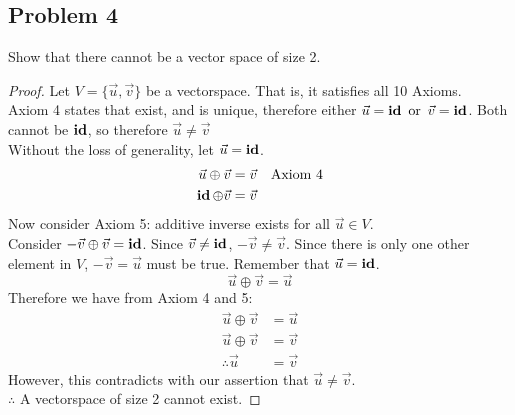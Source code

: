 \subsection*{Problem 4}
Show that there cannot be a vector space of size 2.
\begin{proof}
  Let $V = \{\vec{u}, \vec{v}\}$ be a vectorspace. That is, it satisfies all 10 Axioms. \\
  Axiom 4 states that \id exist, and is unique, therefore either $\vec{u} = \operatorname{\textbf{id}} \operatorname{~\text{or}~} \vec{v} = \operatorname{\textbf{id}}$. Both cannot be $\operatorname{\textbf{id}}$, so therefore $\vec{u} \neq \vec{v}$ \\
  Without the loss of generality, let $\vec{u} = \operatorname{\textbf{id}}$.
  \begin{align*}
    \vec{u} \oplus \vec{v}  & = \vec{v} & \text{Axiom 4} \\
    \operatorname{\textbf{id}} \oplus \vec{v} & = \vec{v}
  \end{align*}
  Now consider Axiom 5: additive inverse exists for all $\vec{u} \in V$. \\
  Consider $-\vec{v} \oplus \vec{v} = \operatorname{\textbf{id}}$. Since $\vec{v} \neq \operatorname{\textbf{id}}$, $-\vec{v} \neq \vec{v}$. Since there is only one other element in $V$, $-\vec{v} = \vec{u}$ must be true. Remember that $\vec{u} = \operatorname{\textbf{id}}$.
  \[
    \vec{u} \oplus \vec{v} = \vec{u}
  \]
  Therefore we have from Axiom 4 and 5:
  \begin{align*}
    \vec{u} \oplus \vec{v} & = \vec{u} \\
    \vec{u} \oplus \vec{v} & = \vec{v} \\
    \therefore \vec{u}     & = \vec{v}
  \end{align*}
  However, this contradicts with our assertion that $\vec{u} \neq \vec{v}$. \\
  $\therefore$ A vectorspace of size 2 cannot exist.

\end{proof}
